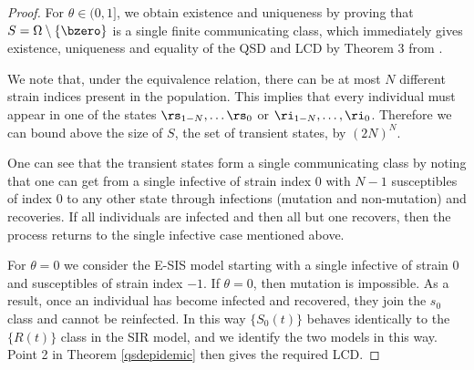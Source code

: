 \documentclass[review]{elsarticle}
\begin{document}
\begin{proof}
	For $\theta \in (0,1]$, we obtain existence and uniqueness by proving that $S=\Omega\setminus\{\bzero\}$ is a single finite communicating class, which immediately gives existence, uniqueness and equality of the QSD and LCD by Theorem 3 from \cite{vanDoorn2013}. 
	
	We note that, under the equivalence relation, there can be at most $N$ different strain indices present in the population. This implies that every individual must appear in one of the states $\rs_{1-N},\dots \rs_0$ or $\ri_{1-N},\dots, \ri_0$. Therefore we can bound above the size of $S$, the set of transient states, by $(2N)^N$. 
	
	One can see that the transient states form a single communicating class by noting that one can get from a single infective of strain index $0$ with $N-1$ susceptibles of index 0 to any other state through infections (mutation and non-mutation) and recoveries. If all individuals are infected and then all but one recovers, then the process returns to the single infective case mentioned above.
	
	For $\theta = 0$ we consider the E-SIS model starting with a single infective of strain $0$ and susceptibles of strain index $-1$. If $\theta = 0$, then mutation is impossible. As a result, once an individual has become infected and recovered, they join the $s_0$ class and cannot be reinfected. In this way $\{S_0(t)\}$ behaves identically to the $\{R(t)\}$ class in the SIR model, and we identify the two models in this way. Point 2 in Theorem \ref{qsdepidemic} then gives the required LCD.
\end{proof}
\end{document}
